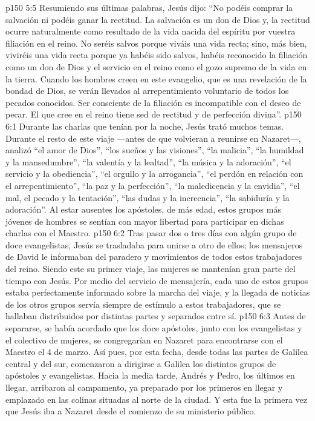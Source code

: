 \vs p150 5:5 Resumiendo sus últimas palabras, Jesús dijo: “No podéis comprar la salvación ni podéis ganar la rectitud. La salvación es un don de Dios y, la rectitud ocurre naturalmente como resultado de la vida nacida del espíritu por vuestra filiación en el reino. No seréis salvos porque viváis una vida recta; sino, más bien, viviréis una vida recta porque ya habéis sido salvos, habéis reconocido la filiación como un don de Dios y el servicio en el reino como el gozo supremo de la vida en la tierra. Cuando los hombres creen en este evangelio, que es una revelación de la bondad de Dios, se verán llevados al arrepentimiento voluntario de todos los pecados conocidos. Ser consciente de la filiación es incompatible con el deseo de pecar. El que cree en el reino tiene sed de rectitud y de perfección divina”.
\vs p150 6:1 Durante las charlas que tenían por la noche, Jesús trató muchos temas. Durante el resto de este viaje ---antes de que volvieran a reunirse en Nazaret---, analizó “el amor de Dios”, “los sueños y las visiones”, “la malicia”, “la humildad y la mansedumbre”, “la valentía y la lealtad”, “la música y la adoración”, “el servicio y la obediencia”, “el orgullo y la arrogancia”, “el perdón en relación con el arrepentimiento”, “la paz y la perfección”, “la maledicencia y la envidia”, “el mal, el pecado y la tentación”, “las dudas y la increencia”, “la sabiduría y la adoración”. Al estar ausentes los apóstoles, de más edad, estos grupos más jóvenes de hombres se sentían con mayor libertad para participar en dichas charlas con el Maestro.
\vs p150 6:2 Tras pasar dos o tres días con algún grupo de doce evangelistas, Jesús se trasladaba para unirse a otro de ellos; los mensajeros de David le informaban del paradero y movimientos de todos estos trabajadores del reino. Siendo este su primer viaje, las mujeres se mantenían gran parte del tiempo con Jesús. Por medio del servicio de mensajería, cada uno de estos grupos estaba perfectamente informado sobre la marcha del viaje, y la llegada de noticias de los otros grupos servía siempre de estímulo a estos trabajadores, que se hallaban distribuidos por distintas partes y separados entre sí.
\vs p150 6:3 Antes de separarse, se había acordado que los doce apóstoles, junto con los evangelistas y el colectivo de mujeres, se congregarían en Nazaret para encontrarse con el Maestro el 4 de marzo. Así pues, por esta fecha, desde todas las partes de Galilea central y del sur, comenzaron a dirigirse a Galilea los distintos grupos de apóstoles y evangelistas. Hacia la media tarde, Andrés y Pedro, los últimos en llegar, arribaron al campamento, ya preparado por los primeros en llegar y emplazado en las colinas situadas al norte de la ciudad. Y esta fue la primera vez que Jesús iba a Nazaret desde el comienzo de su ministerio público.
